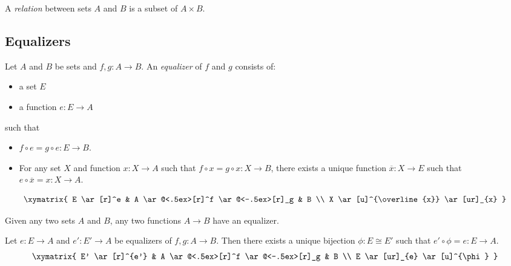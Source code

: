 \begin{df}
  [Relation]
  A \emph{relation} between sets $A$ and $B$ is a subset of $A \times B$.
\end{df}

\subsection{Equalizers}

\begin{df}[Equalizer]
  Let $A$ and $B$ be sets and $f, g : A \rightarrow B$. An \emph{equalizer} of 
  $f$ and $g$ consists of:
  \begin{itemize}
    \item
    a set $E$
    \item
    a function $e : E \rightarrow A$
  \end{itemize}
  such that
  \begin{itemize}
    \item
    $f \circ e = g \circ e : E \rightarrow B$.
    \item
    For any set $X$ and function $x : X \rightarrow A$ such that $f \circ x = g 
    \circ x : X \rightarrow B$, there exists a unique function $\overline{x} : 
    X 
    \rightarrow E$ such that $e \circ \overline{x} = x : X \rightarrow A$.
  \end{itemize}
  \[ \xymatrix{
    E \ar[r]^e & A \ar@<.5ex>[r]^f \ar@<-.5ex>[r]_g & B \\
    X \ar[u]^{\overline{x}} \ar[ur]_{x}
  } \]
\end{df}

\begin{ax}[Equalizers]
  Given any two sets $A$ and $B$, any two functions $A \rightarrow B$ have an 
  equalizer.
\end{ax}

\begin{thm}
  Let $e : E \rightarrow A$ and $e' : E' \rightarrow A$ be equalizers of $f, g : 
  A \rightarrow B$. Then there exists a unique bijection $\phi : E \cong E'$ 
  such 
  that $e' \circ \phi = e : E \rightarrow A$.
  \[ \xymatrix{
    E' \ar[r]^{e'} & A \ar@<.5ex>[r]^f \ar@<-.5ex>[r]_g & B \\
    E \ar[ur]_{e} \ar[u]^{\phi}
  } \]
\end{thm}

